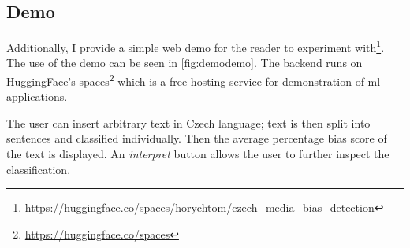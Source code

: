 \begin{figure}
\end{figure}

\subsection{Demo}
Additionally, I provide a simple web demo for the reader to experiment with\footnote{\url{https://huggingface.co/spaces/horychtom/czech_media_bias_detection}}. The use of the demo can be seen in \ref{fig:demodemo}. The backend runs on HuggingFace's spaces\footnote{\url{https://huggingface.co/spaces}} which is a free hosting service for demonstration of \gls{ml} applications. 

The user can insert arbitrary text in Czech language; text is then split into sentences and classified individually. Then the average percentage bias score of the text is displayed. An \textit{interpret} button allows the user to further inspect the classification.

\begin{figure}
\end{figure}
